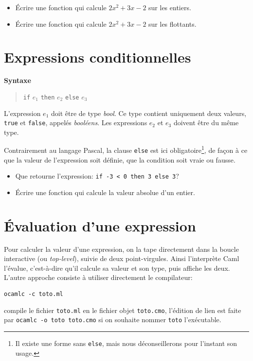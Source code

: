 \documentclass[11pt, a4paper]{article}
\begin{document}
\begin{itemize}
\item Écrire une fonction qui calcule $2x^2+3x-2$ sur les entiers.
\item Écrire une fonction qui calcule $2x^2+3x-2$ sur les flottants.
\end{itemize}

\section{Expressions conditionnelles}

{\bf Syntaxe}
\begin{quote}
\verb+if+ $e_1$ \verb+then+ $e_2$ \verb+else+ $e_3$
\end{quote}
L'expression $e_1$ doit être de type {\em bool}. Ce type contient
uniquement deux valeurs, {\tt true} et {\tt false}, appelés {\em
booléens}. Les expressions $e_2$ et $e_3$ doivent être du même type.

Contrairement au langage Pascal, la clause {\tt else} est ici
obligatoire\footnote{Il existe une forme sans {\tt else}, mais nous
déconseillerons pour l'instant son usage.}, de façon à ce que la
valeur de l'expression soit définie, que la condition soit vraie ou
fausse.

\begin{itemize}
\item Que retourne l'expression: \verb|if -3 < 0 then 3 else 3|?
\item Écrire une fonction qui calcule la valeur absolue d'un entier.
\end{itemize}

\section{Évaluation d'une expression}

Pour calculer la valeur d'une expression, on la tape directement dans
la boucle interactive (ou {\em top-level}), suivie de deux
point-virgules. Ainsi l'interprète Caml l'évalue, c'est-à-dire qu'il
calcule sa valeur et son type, puis affiche les deux. L'autre approche
consiste à utiliser directement le compilateur:
\begin{verbatim}
ocamlc -c toto.ml
\end{verbatim}
compile le fichier \texttt{toto.ml} en le fichier objet
\texttt{toto.cmo}, l'édition de lien est faite par
\verb|ocamlc -o toto toto.cmo| si on souhaite nommer \texttt{toto}
l'exécutable.
\end{document}
